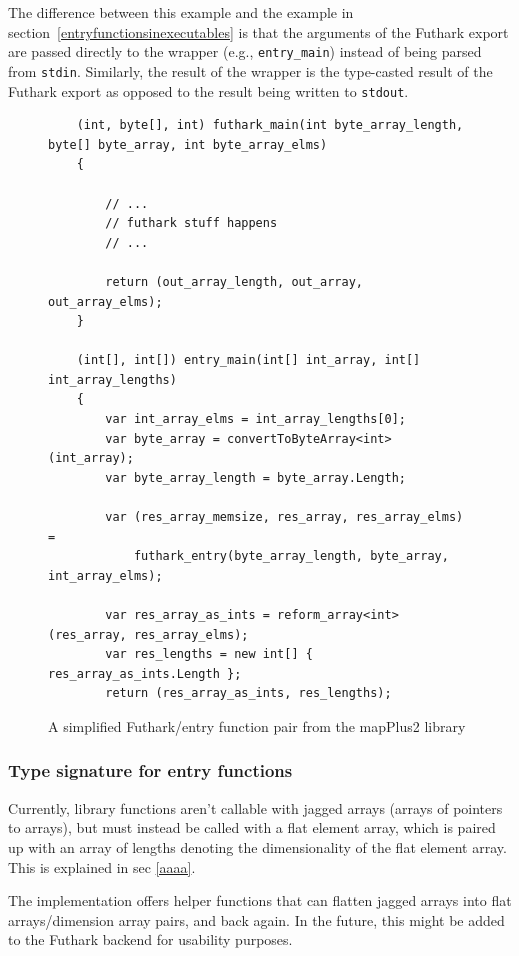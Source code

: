 The difference between this example and the example in 
section~\ref{entryfunctionsinexecutables} is that the arguments of the Futhark export
are passed directly to the wrapper (e.g., {\tt entry\_main}) instead of being parsed
from {\tt stdin}. Similarly, the result of the wrapper is the type-casted result of
the Futhark export as opposed to the result being written to \texttt{stdout}.
\begin{figure}[H]
  \centering
\begin{verbatim}
    (int, byte[], int) futhark_main(int byte_array_length, byte[] byte_array, int byte_array_elms)
    {

        // ...
        // futhark stuff happens
        // ...

        return (out_array_length, out_array, out_array_elms);
    }

    (int[], int[]) entry_main(int[] int_array, int[] int_array_lengths)
    {
        var int_array_elms = int_array_lengths[0];
        var byte_array = convertToByteArray<int>(int_array);
        var byte_array_length = byte_array.Length;

        var (res_array_memsize, res_array, res_array_elms) =
            futhark_entry(byte_array_length, byte_array, int_array_elms);

        var res_array_as_ints = reform_array<int>(res_array, res_array_elms);
        var res_lengths = new int[] { res_array_as_ints.Length };
        return (res_array_as_ints, res_lengths);
\end{verbatim}
  \caption{A simplified Futhark/entry function pair from the mapPlus2 library}
  \label{fig:futharkentrypairlib}
\end{figure}

\subsubsection{Type signature for entry functions}
Currently, library functions aren't callable with jagged arrays (arrays of 
pointers to arrays), but must instead be called with a flat element array,
which is paired up with an array of lengths denoting the dimensionality of 
the flat element array. This is explained in sec \ref{aaaa}.

The \fshark{} implementation offers helper functions that can flatten jagged
arrays into flat arrays/dimension array pairs, and back again.
In the future, this might be added to the Futhark \csharp{} backend for
usability purposes.

